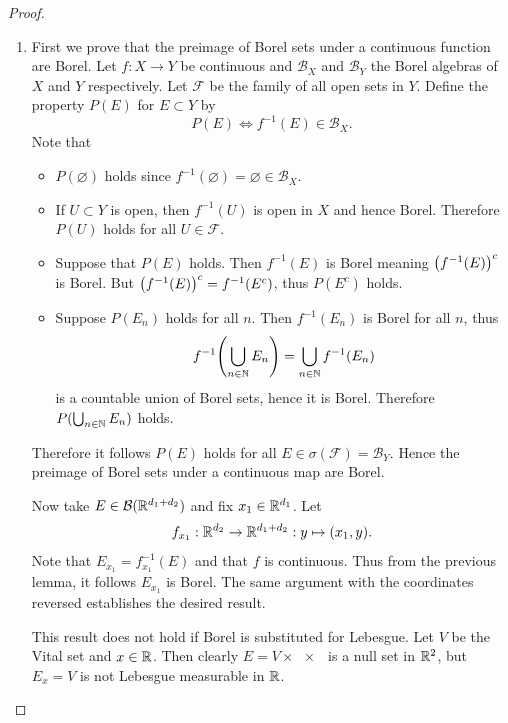 \documentclass[hw_all.tex]{subfiles}
\begin{document}
\begin{proof}
\begin{enumerate}
        \item
            First we prove that the preimage of Borel sets under a continuous function are Borel. Let $f : X \to Y$ be continuous and $\mathcal{B}_X$ and $\mathcal{B}_Y$ the Borel algebras of $X$ and $Y$ respectively. Let $\mathcal{F}$ be the family of all open sets in $Y$. Define the property $P(E)$ for $E \subset Y$ by
            \[
                P(E) \Leftrightarrow f^{-1}(E) \in \mathcal{B}_X
            .\]
            Note that
            \begin{itemize}
                \item 
                    $P(\varnothing)$ holds since $f^{-1}(\varnothing) = \varnothing \in \mathcal{B}_X$.

                \item 
                    If $U \subset Y$ is open, then $f^{-1}(U)$ is open in $X$ and hence Borel. Therefore $P(U)$ holds for all $U \in \mathcal{F}$.

                \item 
                    Suppose that $P(E)$ holds. Then $f^{-1}(E)$ is Borel meaning $\qty(f^{-1}(E))^c$ is Borel. But $\qty(f^{-1}(E))^c = f^{-1}(E^c)$, thus $P(E^c)$ holds.

                \item 
                    Suppose $P(E_n)$ holds for all $n$. Then $f^{-1}(E_n)$ is Borel for all $n$, thus
                    \[
                        f^{-1}\qty(\bigcup_{n \in \mathbb{N}} E_n) = \bigcup_{n \in \mathbb{N}} f^{-1}(E_n)
                    \]
                    is a countable union of Borel sets, hence it is Borel. Therefore $P(\bigcup_{n \in \mathbb{N}} E_n)$ holds.
            \end{itemize}

            Therefore it follows $P(E)$ holds for all $E \in \sigma(\mathcal{F}) = \mathcal{B}_Y$. Hence the preimage of Borel sets under a continuous map are Borel.

            Now take $E \in \mathcal{B}(\mathbb{R}^{d_1 + d_2})$ and fix $x_1 \in \mathbb{R}^{d_1}$. Let
            \[
                f_{x_1} : \mathbb{R}^{d_2} \to \mathbb{R}^{d_1 + d_2} : y \mapsto (x_1, y)
            .\]
            Note that $E_{x_1} = f^{-1}_{x_1}(E)$ and that $f$ is continuous. Thus from the previous lemma, it follows $E_{x_1}$ is Borel. The same argument with the coordinates reversed establishes the desired result.

            This result does not hold if Borel is substituted for Lebesgue. Let $V$ be the Vital set and $x \in \mathbb{R}$. Then clearly $E = V \times \qty{x}$ is a null set in $\mathbb{R}^2$, but $E_x = V$ is not Lebesgue measurable in $\mathbb{R}$.


\end{enumerate}
\end{proof}
\end{document}

